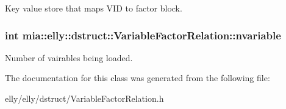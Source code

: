 Key value store that maps V\-I\-D to factor block. \hypertarget{classmia_1_1elly_1_1dstruct_1_1_variable_factor_relation_ac3f1f9186a88af83b82868b4077ccdc2}{
\subsubsection[{nvariable}]{\setlength{\rightskip}{0pt plus 5cm}int mia\-::elly\-::dstruct\-::\-Variable\-Factor\-Relation\-::nvariable}}\label{classmia_1_1elly_1_1dstruct_1_1_variable_factor_relation_ac3f1f9186a88af83b82868b4077ccdc2}
Number of vairables being loaded. 

The documentation for this class was generated from the following file\-:\begin{DoxyCompactItemize}
\item 
elly/elly/dstruct/Variable\-Factor\-Relation.\-h\end{DoxyCompactItemize}
